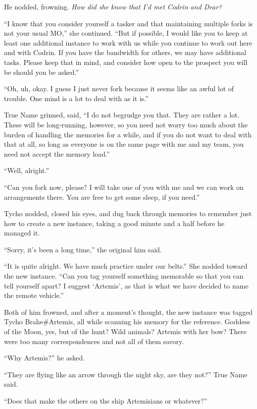 He nodded, frowning. \emph{How did she know that I'd met Codrin and Dear?}

``I know that you consider yourself a tasker and that maintaining multiple forks is not your usual MO,'' she continued. ``But if possible, I would like you to keep at least one additional instance to work with us while you continue to work out here and with Codrin. If you have the bandwidth for others, we may have additional tasks. Please keep that in mind, and consider how open to the prospect you will be should you be asked.''

``Oh, uh, okay. I guess I just never fork because it seems like an awful lot of trouble. One mind is a lot to deal with as it is.''

True Name grinned, said, ``I do not begrudge you that. They are rather a lot. These will be long-running, however, so you need not worry too much about the burden of handling the memories for a while, and if you do not want to deal with that at all, so long as everyone is on the same page with me and my team, you need not accept the memory load.''

``Well, alright.''

``Can you fork now, please? I will take one of you with me and we can work on arrangements there. You are free to get some sleep, if you need.''

Tycho nodded, closed his eyes, and dug back through memories to remember just how to create a new instance, taking a good minute and a half before he managed it.

``Sorry, it's been a long time,'' the original him said.

``It is quite alright. We have much practice under our belts.'' She nodded toward the new instance. ``Can you tag yourself something memorable so that you can tell yourself apart? I suggest `Artemis', as that is what we have decided to name the remote vehicle.''

Both of him frowned, and after a moment's thought, the new instance was tagged Tycho Brahe\#Artemis, all while scanning his memory for the reference. Goddess of the Moon, yes, but of the hunt? Wild animals? Artemis with her bow? There were too many correspondences and not all of them savory.

``Why Artemis?'' he asked.

``They are flying like an arrow through the night sky, are they not?'' True Name said.

``Does that make the others on the ship Artemisians or whatever?''

